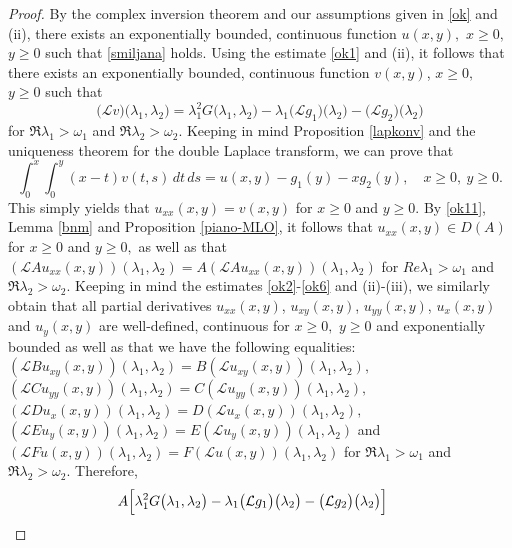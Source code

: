 \documentclass{amsart}
\theoremstyle{definition}
\theoremstyle{remark}
\numberwithin{equation}{section}
\begin{document}
\begin{proof}
By the complex inversion theorem and our assumptions given in \eqref{ok} and (ii), there exists an exponentially bounded, continuous function $u(x,y),$  $x\geq 0,$ $y\geq 0$ such that \eqref{smiljana} holds. Using the estimate \eqref{ok1} and (ii), it follows that there exists an exponentially bounded, continuous function $v(x,y)$, $x\geq 0,$ $y\geq 0$ such that  $$\bigl({\mathcal L v}\bigr)\bigl( \lambda_{1},\lambda_{2}\bigr)=\lambda_{1}^{2} G \bigl(\lambda_{1},\lambda_{2}\bigr)-\lambda_{1}\bigl({\mathcal L} g_{1}\bigr)\bigl( \lambda_{2} \bigr)-\bigl({\mathcal L} g_{2}\bigr)\bigl( \lambda_{2} \bigr)$$
for $\Re \lambda_{1} >\omega_{1}$ and $ \Re \lambda_{2}>\omega_{2}.$ Keeping in mind 
Proposition
\ref{lapkonv} and the uniqueness theorem for the double Laplace transform, we can prove that 
$$
\int^{x}_{0}\int^{y}_{0}(x-t)v(t,s)\, dt\, ds=u(x,y)-g_{1}(y)-xg_{2}(y),\quad x\geq 0, \ y\geq 0.
$$
This simply yields that $u_{xx}(x,y)=v(x,y)$ for $x\geq 0$ and $y\geq 0.$ By \eqref{ok11}, Lemma \ref{bnm} and Proposition \ref{piano-MLO}, it follows that $u_{xx}(x,y)\in D(A)$ for $x\geq 0$ and $y\geq 0,$ as well as that $({\mathcal L}Au_{xx}(x,y))(\lambda_{1},\lambda_{2})=A({\mathcal L}Au_{xx}(x,y))(\lambda_{1},\lambda_{2})$ for $ Re \lambda_{1} >\omega_{1}$ and $ \Re \lambda_{2}>\omega_{2} .$
Keeping in mind  the estimates \eqref{ok2}-\eqref{ok6} and (ii)-(iii), we similarly obtain that all partial derivatives $u_{xx}(x,y)$, $u_{xy}(x,y)$, $u_{yy}(x,y)$, $u_{x}(x,y)$ and $u_{y}(x,y)$ are well-defined, continuous for $x\geq 0,$ $y\geq 0$ and exponentially bounded as well as that we have the following equalities:\\ $({\mathcal L}Bu_{xy}(x,y))(\lambda_{1},\lambda_{2})=B({\mathcal L}u_{xy}(x,y))(\lambda_{1},\lambda_{2}),$\\ $({\mathcal L}Cu_{yy}(x,y))(\lambda_{1},\lambda_{2})=C({\mathcal L}u_{yy}(x,y))(\lambda_{1},\lambda_{2}),$\\
$({\mathcal L}Du_{x}(x,y))(\lambda_{1},\lambda_{2})=D({\mathcal L}u_{x }(x,y))(\lambda_{1},\lambda_{2}) ,$\\
$({\mathcal L}Eu_{y}(x,y))(\lambda_{1},\lambda_{2}) =E({\mathcal L}u_{y}(x,y))(\lambda_{1},\lambda_{2})$ and\\ $({\mathcal L}Fu(x,y))(\lambda_{1},\lambda_{2})=F({\mathcal L}u(x,y))(\lambda_{1},\lambda_{2})$ 
for $ \Re \lambda_{1} >\omega_{1}$ and $ \Re \lambda_{2}>\omega_{2} .$ Therefore, 
\begin{align*}
A\Bigl[ \lambda_{1}^{2} G&\bigl(\lambda_{1},\lambda_{2}\bigr)-\lambda_{1}\bigl({\mathcal L} g_{1}\bigr)\bigl( \lambda_{2} \bigr)-\bigl({\mathcal L} g_{2}\bigr)\bigl( \lambda_{2} \bigr)\Bigr]

\end{align*}
\end{proof}
\end{document}
